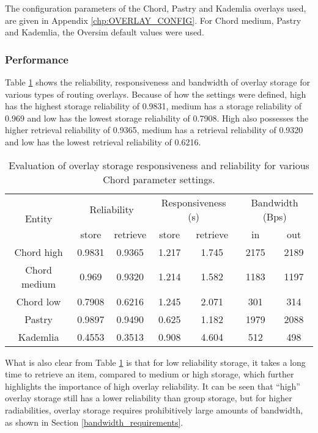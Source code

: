 The configuration parameters of the Chord, Pastry and Kademlia overlays used, are given in Appendix \ref{chp:OVERLAY_CONFIG}. For Chord medium, Pastry and Kademlia, the Oversim default values were used.

\subsubsection{Performance}

Table \ref{tab_overlay_rel_resp_results} shows the reliability, responsiveness and bandwidth of overlay storage for various types of routing overlays. Because of how the settings were defined, high has the highest storage reliability of 0.9831, medium has a storage reliability of 0.969 and low has the lowest storage reliability of 0.7908. High also possesses the higher retrieval reliability of 0.9365, medium has a retrieval reliability of 0.9320 and low has the lowest retrieval reliability of 0.6216.
%
\begin{table}[htbp]
\centering
\begin{tabular}{|c|c|c|c|c|c|c|}
\hline
\multirow{2}{*}{Entity}       & \multicolumn{2}{c|}{Reliability}    &\multicolumn{2}{c|}{Responsiveness (s)}& \multicolumn{2}{c|}{Bandwidth (Bps)}\\
\cline{2-7}
             &store & retrieve & store & retrieve     & in & out\\
\hline
Chord high   & 0.9831&0.9365 & 1.217&1.745  & 2175&2189 \\
Chord medium & 0.969&0.9320  & 1.214&1.582  & 1183&1197\\
Chord low    & 0.7908&0.6216 & 1.245&2.071  & 301 &314\\
Pastry       & 0.9897&0.9490 & 0.625&1.182  & 1979&2088\\
Kademlia     & 0.4553&0.3513 & 0.908&4.604  & 512 &498\\
\hline
\end{tabular}
\caption{Evaluation of overlay storage responsiveness and reliability for various Chord parameter settings.}
\label{tab_overlay_rel_resp_results}
\end{table}

What is also clear from Table \ref{tab_overlay_rel_resp_results} is that for low reliability storage, it takes a long time to retrieve an item, compared to medium or high storage, which further highlights the importance of high overlay reliability. It can be seen that ``high'' overlay storage still has a lower reliability than group storage, but for higher radiabilities, overlay storage requires prohibitively large amounts of bandwidth, as shown in Section \ref{bandwidth_requirements}.


